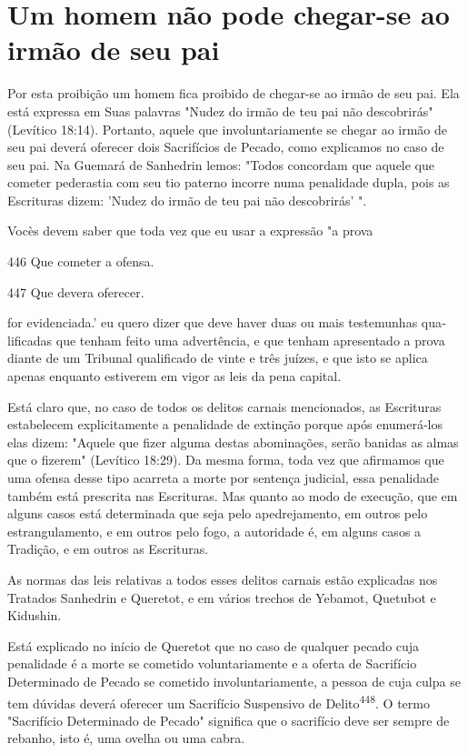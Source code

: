 \section{Um homem não pode chegar-se ao irmão de seu pai}

Por esta proibição um homem fica proibido de chegar-se ao irmão de seu
pai. Ela está expressa em Suas palavras "Nudez do irmão de teu pai não
descobrirás" (Levítico 18:14). Portanto, aquele que involuntariamente se
che­gar ao irmão de seu pai deverá oferecer dois Sacrifícios de Pecado,
como expli­camos no caso de seu pai. Na Guemará de Sanhedrin lemos:
"Todos concor­dam que aquele que cometer pederastia com seu tio paterno
incorre numa pe­nalidade dupla, pois as Escrituras dizem: 'Nudez do
irmão de teu pai não descobrirás' ".


Vocès devem saber que toda vez que eu usar a expressão "a prova


446 Que cometer a ofensa.

447 Que devera oferecer.


for evidenciada.' eu quero dizer que deve haver duas
ou mais testemunhas qua­lificadas que tenham feito uma advertência, e
que tenham apresentado a prova diante de um Tribunal qualificado de
vinte e três juízes, e que isto se aplica apenas enquanto estiverem em
vigor as leis da pena capital.

Está claro que, no caso de todos os delitos carnais mencionados, as
Escrituras estabelecem explicitamente a penalidade de extinção porque
após enumerá-los elas dizem: "Aquele que fizer alguma destas
abominações, serão banidas as almas que o fizerem" (Levítico 18:29). Da
mesma forma, toda vez que afirmamos que uma ofensa desse tipo acarreta a
morte por sentença judi­cial, essa penalidade também está prescrita nas
Escrituras. Mas quanto ao modo de execução, que em alguns casos está
determinada que seja pelo apedrejamento, em outros pelo estrangulamento,
e em outros pelo fogo, a autoridade é, em alguns casos a Tradição, e em
outros as Escrituras.

As normas das leis relativas a todos esses delitos carnais estão
expli­cadas nos Tratados Sanhedrin e Queretot, e em vários trechos de
Yebamot, Que­tubot e Kidushin.

Está explicado no início de Queretot que no caso de qualquer peca­do
cuja penalidade é a morte se cometido voluntariamente e a oferta de
Sacrifí­cio Determinado de Pecado se cometido involuntariamente, a
pessoa de cuja culpa se tem dúvidas deverá oferecer um Sacrifício
Suspensivo de Delito\textsuperscript{448}. O termo "Sacrifício
Determinado de Pecado" significa que o sacrifício deve ser sempre de
rebanho, isto é, uma ovelha ou uma cabra.

